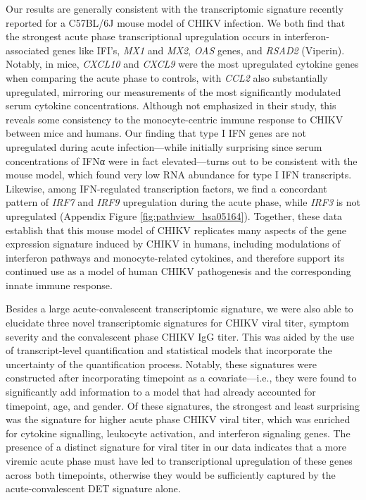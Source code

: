Our results are generally consistent with the transcriptomic signature recently reported for a C57BL/6J mouse model of CHIKV infection.\autocite{Wilson2017} We both find that the strongest acute phase transcriptional upregulation occurs in interferon-associated genes like IFI’s, \emph{MX1} and \emph{MX2}, \emph{OAS} genes, and \emph{RSAD2} (Viperin).\autocite{Wilson2017} Notably, in mice, \emph{CXCL10} and \emph{CXCL9} were the most upregulated cytokine genes when comparing the acute phase to controls, with \emph{CCL2} also substantially upregulated,\autocite{Wilson2017} mirroring our measurements of the most significantly modulated serum cytokine concentrations. Although not emphasized in their study, this reveals some consistency to the monocyte-\allowbreak centric immune response to CHIKV between mice and humans. Our finding that type I IFN genes are not upregulated during acute infection—while initially surprising since serum concentrations of IFNα were in fact elevated—turns out to be consistent with the mouse model, which found very low RNA abundance for type I IFN transcripts.\autocite{Wilson2017} Likewise, among IFN-regulated transcription factors, we find a concordant pattern of \emph{IRF7} and \emph{IRF9} upregulation during the acute phase, while \emph{IRF3} is not upregulated (Appendix Figure \ref{fig:pathview_hsa05164}). Together, these data establish that this mouse model of CHIKV replicates many aspects of the gene expression signature induced by CHIKV in humans, including modulations of interferon pathways and monocyte-related cytokines, and therefore support its continued use as a model of human CHIKV pathogenesis and the corresponding innate immune response.

Besides a large acute-convalescent transcriptomic signature, we were also able to elucidate three novel transcriptomic signatures for CHIKV viral titer, symptom severity and the convalescent phase CHIKV IgG titer. This was aided by the use of transcript-level quantification and statistical models that incorporate the uncertainty of the quantification process.\autocite{Pimentel2016} Notably, these signatures were constructed after incorporating timepoint as a covariate—i.e., they were found to significantly add information to a model that had already accounted for timepoint, age, and gender. Of these signatures, the strongest and least surprising was the signature for higher acute phase CHIKV viral titer, which was enriched for cytokine signalling, leukocyte activation, and interferon signaling genes. The presence of a distinct signature for viral titer in our data indicates that a more viremic acute phase must have led to transcriptional upregulation of these genes across both timepoints, otherwise they would be sufficiently captured by the acute-convalescent DET signature alone.

